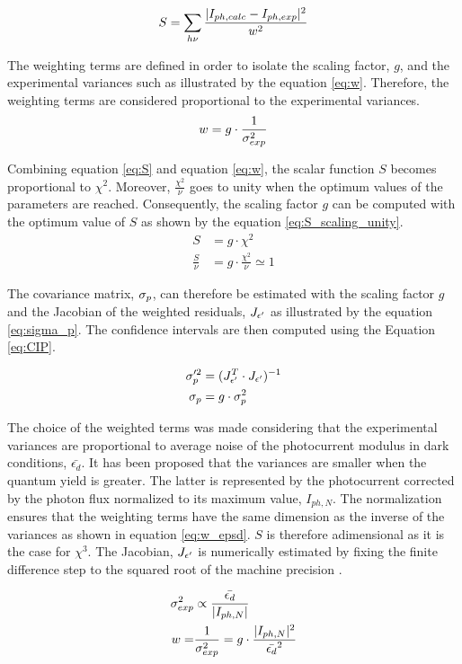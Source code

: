 \begin{equation}
\begin{split}
S &= \sum _{h\nu} \frac{\vert I_{ph,calc}-I_{ph,exp} \vert^2}{w ^2} \\
\end{split}
\label{eq:S}
\end{equation}

The weighting terms are defined in order to isolate the scaling factor, $g$, 
and the experimental variances such as illustrated by the equation \ref{eq:w}. 
Therefore, the weighting terms are considered proportional to the experimental 
variances.
\begin{equation}
	w=g \cdot \frac{1}{\sigma _{exp} ^2}
	\label{eq:w}
\end{equation}	
	
Combining equation \ref{eq:S} and equation \ref{eq:w}, the scalar function $S$ 
becomes proportional to $\chi ^2$. Moreover, $\frac{\chi ^2}{\nu}$ goes to unity 
when the optimum values of the parameters are reached. Consequently, 
the scaling factor $g$ can be computed with the optimum value of $S$ as shown 
by the equation \ref{eq:S_scaling_unity}.
\begin{equation}
\begin{split}
S &=g \cdot \chi ^2 \\
\frac{S}{\nu}&=g \cdot \frac{\chi ^2}{\nu} \simeq 1
\end{split}
\label{eq:S_scaling_unity}
\end{equation}
	

The covariance matrix, $\sigma _{p}$, can therefore be estimated with the scaling 
factor $g$ and the Jacobian of the weighted residuals, $J _{\epsilon ^{\prime}}$ as illustrated 
by the equation \ref{eq:sigma_p}. The confidence intervals are then computed 
using the Equation \ref{eq:CIP}.
	
\begin{equation}
\begin{split}
\sigma _{p} ^{\prime 2} &= ( J _{\epsilon ^{\prime}} ^T \cdot J _{\epsilon ^{\prime}} ) ^{-1} \\
\sigma _{p} &= g \cdot \sigma _{p} ^2
\end{split}
\label{eq:sigma_p}
\end{equation}

The choice of the weighted terms was made considering that the experimental 
variances are proportional to average noise of the photocurrent modulus in 
dark conditions, $\bar{\epsilon _d}$. It has been proposed that the variances 
are smaller when the quantum yield is greater. 
The latter is represented by the photocurrent corrected by the photon flux 
normalized to its maximum value, $I_{ph,N}$. 
The normalization ensures that the weighting terms have the same dimension as 
the inverse of the variances as shown in equation \ref{eq:w_epsd}. 
$S$ is therefore adimensional as it is the case for $\chi ^3$. 
The Jacobian, $J _{\epsilon ^{\prime}}$ is numerically estimated by fixing the finite difference 
step to the squared root of the machine precision \citep{nocedal2006, press2007}.

\begin{equation}
\begin{split}
\sigma _{exp} ^2 & \propto \frac{\bar{\epsilon _d}}{\vert I_{ph,N} \vert} \\
w = & \frac{1}{\sigma _{exp} ^2} = g \cdot \frac{\vert I_{ph,N} \vert ^2}{\bar{\epsilon _d} ^2}
\end{split}
\label{eq:w_epsd}
\end{equation}
